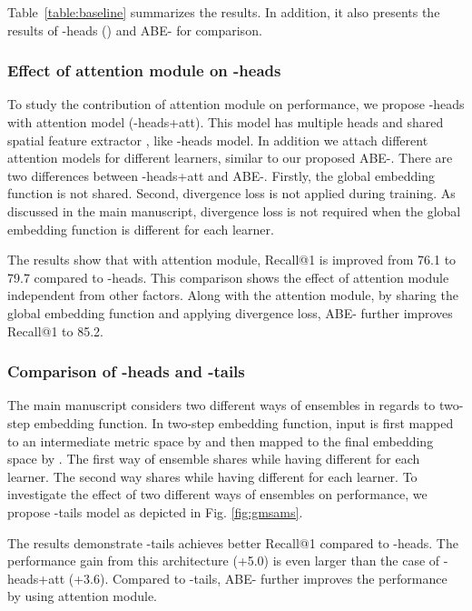 \documentclass[runningheads]{llncs}
\begin{document}
Table~\ref{table:baseline} summarizes the results. In addition, it also presents the results of -heads () and ABE- for comparison.



\subsubsection{Effect of attention module on -heads}
\label{sec:m-heads-att}

To study the contribution of attention module on performance, we propose
-heads with attention model (-heads+att). This model has multiple heads 
and shared spatial feature extractor , like -heads model. In addition we attach 
different attention models for  different learners, similar to our proposed ABE-.
There are two differences between -heads+att and ABE-. Firstly, the global
 embedding function  is not shared. Second, divergence loss is not applied during
training. As discussed in the main manuscript, divergence loss is not required
when the global embedding function  is different for each learner.

The results show that with attention module, Recall@1 is improved from
76.1 to 79.7 compared to -heads. This comparison shows the effect of
attention module independent from other factors. Along with the attention module,
 by sharing the global embedding function  and applying divergence loss, ABE-
 further improves Recall@1 to 85.2.


\subsubsection{Comparison of -heads and -tails}
\label{sec:m-heads-tails}

The main manuscript considers two different ways of ensembles in regards
 to two-step embedding function. In two-step embedding function, input is first mapped
 to an intermediate metric space by  and then mapped to the final embedding
space by . The first way of ensemble shares  while having different 
 for each learner. The second way shares  while having
different  for each learner. To investigate the effect of two different ways of
 ensembles on performance, we propose -tails model as depicted in Fig. \ref{fig:gmsams}.

The results demonstrate -tails achieves better Recall@1 compared to -heads.
The performance gain from this architecture (+5.0) is even larger
than the case of -heads+att (+3.6). Compared to -tails, ABE-
further improves the performance by using attention module.
 
\end{document}
